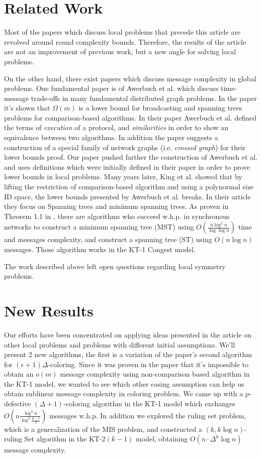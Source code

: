 \documentclass[11pt]{article}
\begin{document}
\section{Related Work}
Most of the papers which discuss local problems that precede this article are revolved around round complexity bounds. Therefore, the results of the article are not an improvement of previous work, but a new angle for solving local problems.

On the other hand, there exist papers which discuss message complexity in global problems. One fundamental paper is of Awerbuch et al.\cite{Awerbuch} which discuss time-message trade-offs in many fundamental distributed graph problems. In the paper it's shown that $\Omega(m)$ is a lower bound for broadcasting and spanning trees problems for comparison-based algorithms. In their paper Awerbuch et al. defined the terms of \textit{execution} of a protocol, and \textit{similarities} in order to show an equivalence between two algorithms. In addition the paper suggests a construction of a special family of network graphs (i.e. \textit{crossed graph}) for their lower bounds proof. Our paper pushed farther the construction of Awerbuch et al. and uses definitions which were initially defined in their paper in order to prove lower bounds in local problems.
Many years later, King et al. \cite{King} showed that by lifting the restriction of comparison-based algorithm and using a polynormal size ID space, the lower bounds presented by Awerbuch et al. breaks. In their article they focus on Spanning trees and minimum spanning trees. As proven in Theorem 1.1 in \cite{King}, there are algorithms who succeed w.h.p. in synchronous networks to construct a minimum spanning tree (MST) using $O(\frac{n\log^2{n}}{\log{\log{n}}})$ time and messages complexity, and construct a spanning tree (ST) using $O(n\log{n})$ messages. Those algorithm works in the KT-1 Congest model.

The work described above left open questions regarding local symmetry problems.

\section{New Results}
Our efforts have been concentrated on applying ideas presented in the article on other local problems and problems with different initial assumptions. We'll present 2 new algorithms, the first is a variation of the paper's second algorithm for $(\epsilon+1)\Delta$-coloring. Since it was proven in the paper that it's impossible to obtain an $o(m)$ message complexity using non-comparison based algorithm in the KT-1 model, we wanted to see which other easing assumption can help us obtain sublinear message complexity in coloring problem. We came up with a $p$-defective $(\Delta+1)$-coloring algorithm in the KT-1 model which exchanges $O(n \frac{\log^3{n}}{\log^2{\frac{p-1}{2}}})$ messages w.h.p.
In addition we explored the ruling set problem, which is a generalization of the MIS problem, and constructed a $(k, k\log{n})$-ruling Set algorithm in the KT-$2(k-1)$ model, obtaining $O(n\cdot\Delta^k\log{n})$ message complexity. 
\end{document}
